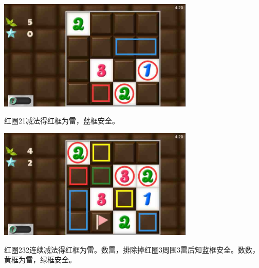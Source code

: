 \subsection{} %
\begin{center}
    \includegraphics[width=0.7\textwidth]{puzzlelow/94-1.jpg}
\end{center}
红圈21减法得红框为雷，蓝框安全。
\begin{center}
    \includegraphics[width=0.7\textwidth]{puzzlelow/94-2.jpg}
\end{center}
红圈232连续减法得红框为雷。数雷，排除掉红圈3周围3雷后知蓝框安全。数数，黄框为雷，绿框安全。

